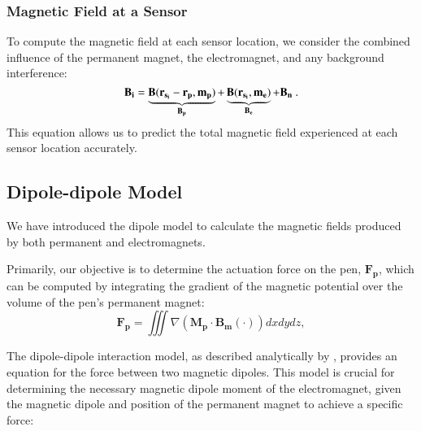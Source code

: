     
    
    
\subsubsection{Magnetic Field at a Sensor}
To compute the magnetic field at each sensor location, we consider the combined influence of the permanent magnet, the electromagnet, and any background interference:
\begin{equation} \label{eq:b_sum}
\mathbf{B_i} =\underbrace{\mathbf{B}(\mathbf{r_{s_i}}-\mathbf{r_{p}}, \mathbf{m_p})}_{\mathbf{B_p}} + \underbrace{\mathbf{B}(\mathbf{r_{s_i}}, \mathbf{m_{e}})}_{\mathbf{B_e}} + \mathbf{B_n} \ .
\end{equation}
This equation allows us to predict the total magnetic field experienced at each sensor location accurately.

\subsection{Dipole-dipole Model} 
\label{ap:em_model}

We have introduced the dipole model to calculate the magnetic fields produced by both permanent and electromagnets.

Primarily, our objective is to determine the actuation force on the pen, $\mathbf{F_p}$, which can be computed by integrating the gradient of the magnetic potential over the volume of the pen's permanent magnet:
\begin{equation}
\mathbf{F_p} = \iiint \nabla \left( \mathbf{M_p} \cdot \mathbf{B_m}(\cdot)\right) dxdydz , \label{eq:gradB2}
\end{equation}

The dipole-dipole interaction model, as described analytically by \citet{yung1998analytic}, provides an equation for the force between two magnetic dipoles. This model is crucial for determining the necessary magnetic dipole moment of the electromagnet, given the magnetic dipole and position of the permanent magnet to achieve a specific force:

